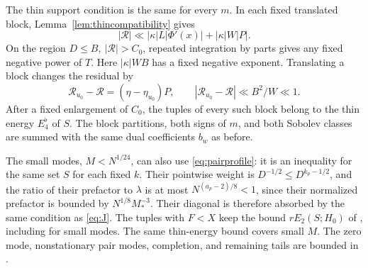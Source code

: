 \documentclass[11pt]{amsart}
\numberwithin{equation}{section}
\begin{document}
The thin support condition is the same for every $m$.
In each fixed translated block,
Lemma~\ref{lem:thincompatibility} gives
\[
 |\mathcal R|\ll|\kappa|L|\Phi'(x)|+|\kappa|W|P|.
\]
On the region \(D\le B,\ |\mathcal R|>C_0\), repeated integration by parts
gives any fixed negative power of $T$. Here \(|\kappa|WB\) has a fixed
negative exponent. Translating a block changes the residual by
\[
 \mathcal R_{u_0}-\mathcal R=(\eta-\eta_{u_0})P,\qquad
 |\mathcal R_{u_0}-\mathcal R|\ll B^2/W\ll1.
\]
After a fixed enlargement of \(C_0\), the tuples of every such block
belong to the thin energy $E_4^\flat$ of $S$. The block partitions,
both signs of $m$, and both Sobolev classes
are summed with the same dual coefficients $b_w$ as before.

The small modes, $M<N^{1/24}$, can also use \eqref{eq:pairprofile}: it
is an inequality for the same set $S$ for each fixed $k$. Their pointwise weight is \(D^{-1/2}\le
D^{k_p-1/2}\), and the ratio of their prefactor to \(\lambda\) is
at most \(N^{(a_p-2)/8}<1\), since their normalized prefactor is bounded by $N^{1/8}M_*^{-3}$. Their diagonal is therefore absorbed by
the same condition as \eqref{eq:J}. The tuples with \(F<X\) keep the
bound \(rE_2(S;H_0)\) of \cite[Lemma~\ref*{six-lem:smallF}]{Weighted},
including for small modes.
The same thin-energy bound covers small $M$.
The zero mode, nonstationary pair modes, completion, and
remaining tails are bounded in
\cite[Proposition~\ref*{six-prop:dualityproof} and
Lemma~\ref*{six-lem:completionproof}]{Weighted}.
\end{document}
